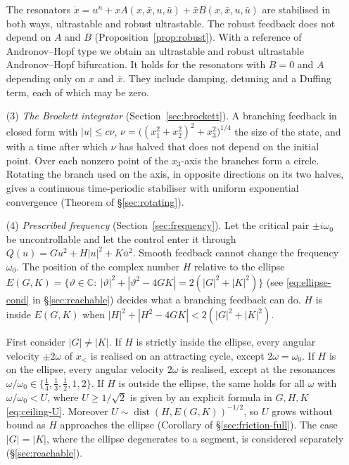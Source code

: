 \documentclass[11pt,reqno]{amsart}
\theoremstyle{plain}
\theoremstyle{definition}
\theoremstyle{remark}
\newcommand{\C}{\mathbb{C}}
\begin{document}
\begin{enumerate}
The resonators $\dot x=u^{n}+xA(x,\bar x,u,\bar u)+\bar xB(x,\bar x,u,\bar u)$ are stabilised in both ways, ultrastable and robust ultrastable. The robust feedback does not depend on $A$ and $B$ (Proposition~\ref{prop:robust}). With a reference of Andronov--Hopf type we obtain an ultrastable and robust ultrastable Andronov--Hopf bifurcation. It holds for the resonators with $B=0$ and $A$ depending only on $x$ and $\bar x$. They include damping, detuning and a Duffing term, each of which may be zero.
\item[(3)] \emph{The Brockett integrator} (Section~\ref{sec:brockett}). A branching feedback in closed form with
  $|u|\le c\nu$, $\nu=\bigl((x_1^{2}+x_2^{2})^{2}+x_3^{2}\bigr)^{1/4}$ the size of the state, and with a time
  after which $\nu$ has halved that does not depend on the initial point. Over each nonzero point of the $x_3$-axis the branches form a circle. Rotating the branch used on the axis, in opposite directions on its two halves, gives a
  continuous time-periodic stabiliser with uniform exponential convergence (Theorem of \S\ref{sec:rotating}).
\item[(4)] \emph{Prescribed frequency} (Section~\ref{sec:frequency}). Let the critical pair $\pm i\omega_0$ be
  uncontrollable and let the control enter it through $Q(u)=Gu^{2}+H|u|^{2}+K\bar u^{2}$. Smooth feedback cannot change
  the frequency $\omega_0$. The position of the complex number $H$ relative to the ellipse
  $E(G,K)=\{\vartheta\in\C:\ |\vartheta|^{2}+|\vartheta^{2}-4GK|=2(|G|^{2}+|K|^{2})\}$ (see \eqref{eq:ellipse-cond} in \S\ref{sec:reachable}) decides what a branching feedback can do. $H$ is inside $E(G,K)$ when
  $|H|^{2}+|H^{2}-4GK|<2(|G|^{2}+|K|^{2})$.

  First consider $|G|\neq|K|$. If $H$ is strictly inside the ellipse, every angular velocity $\pm2\omega$
  of $x_<$ is realised on an attracting cycle, except $2\omega=\omega_0$. If $H$ is on the ellipse,
  every angular velocity $2\omega$ is realised, except at the resonances
  $\omega/\omega_0\in\{\frac14,\frac13,\frac12,1,2\}$.
  If $H$ is outside the ellipse, the same holds for all $\omega$ with $\omega/\omega_0<U$, where $U\ge1/\sqrt2$
  is given by an explicit formula in $G,H,K$ \eqref{eq:ceiling-U}. Moreover
  $U\sim\operatorname{dist}(H,E(G,K))^{-1/2}$, so $U$ grows without bound as $H$ approaches the ellipse (Corollary of \S\ref{sec:friction-full}).
  The case $|G|=|K|$, where the ellipse degenerates to a segment, is considered separately (\S\ref{sec:reachable}).
\end{enumerate}
\end{document}
